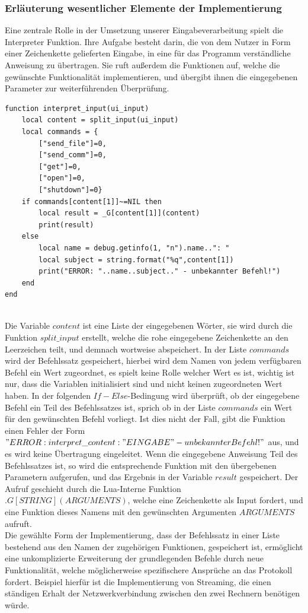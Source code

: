 \subsubsection{Erläuterung wesentlicher Elemente der Implementierung}
Eine zentrale Rolle in der Umsetzung unserer Eingabeverarbeitung spielt die Interpreter Funktion. Ihre Aufgabe besteht darin, die von dem Nutzer in Form einer Zeichenkette gelieferten Eingabe, in eine für das Programm verständliche Anweisung zu übertragen. Sie ruft außerdem die Funktionen auf, welche die gewünschte Funktionalität implementieren, und übergibt ihnen die eingegebenen Parameter zur weiterführenden Überprüfung.\\
\begin{lstlisting}[caption = {Interpreter Funktion}]
function interpret_input(ui_input)
    local content = split_input(ui_input)
    local commands = {
        ["send_file"]=0,
        ["send_comm"]=0,
        ["get"]=0,
        ["open"]=0,
        ["shutdown"]=0}
    if commands[content[1]]~=NIL then
        local result = _G[content[1]](content)
        print(result)
    else
        local name = debug.getinfo(1, "n").name..": "
        local subject = string.format("%q",content[1])
        print("ERROR: "..name..subject.." - unbekannter Befehl!")
    end
end
\end{lstlisting}\hfill\\
Die Variable $content$ ist eine Liste der eingegebenen Wörter, sie wird durch die Funktion $split\_input$ erstellt, welche die rohe eingegebene Zeichenkette an den Leerzeichen teilt, und demnach wortweise abspeichert. In der Liste $commands$ wird der Befehlssatz gespeichert, hierbei wird dem Namen von jedem verfügbaren Befehl ein Wert zugeordnet, es spielt keine Rolle welcher Wert es ist, wichtig ist nur, dass die Variablen initialisiert sind und nicht keinen zugeordneten Wert haben. In der folgenden $If-Else$-Bedingung wird überprüft, ob der eingegebene Befehl ein Teil des Befehlssatzes ist, sprich ob in der Liste $commands$ ein Wert für den gewünschten Befehl vorliegt. Ist dies nicht der Fall, gibt die Funktion einen Fehler der Form $"ERROR: interpret\_content: "EINGABE" - unbekannter Befehl!"$ aus, und es wird keine Übertragung eingeleitet. Wenn die eingegebene Anweisung Teil des Befehlssatzes ist, so wird die entsprechende Funktion mit den übergebenen Parametern aufgerufen, und das Ergebnis in der Variable $result$ gespeichert. Der Aufruf geschieht durch die Lua-Interne Funktion $.G[STRING](ARGUMENTS)$, welche eine Zeichenkette als Input fordert, und eine Funktion dieses Namens mit den gewünschten Argumenten $ARGUMENTS$ aufruft.\\ Die gewählte Form der Implementierung, dass der Befehlssatz in einer Liste bestehend aus den Namen der zugehörigen Funktionen, gespeichert ist, ermöglicht eine unkomplizierte Erweiterung der grundlegenden Befehle durch neue Funktionalität, welche möglicherweise spezifischere Ansprüche an das Protokoll fordert. Beispiel hierfür ist die Implementierung von Streaming, die einen ständigen Erhalt der Netzwerkverbindung zwischen den zwei Rechnern benötigen würde. \\
